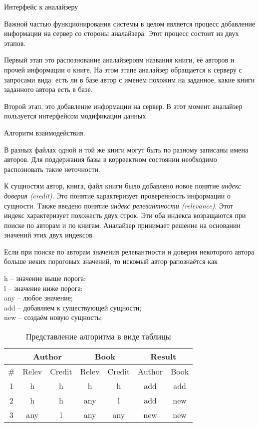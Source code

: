 \newpage

Интерфейс к аналайзеру


Важной частью функционирования системы в целом является процесс добавление информации на сервер со стороны аналайзера. Этот процесс состоит из двух этапов. 

Первый этап это распознование аналайзеровм названия книги, её авторов и прочей информации о книге. На этом этапе аналайзер обращается к серверу с запросами вида: есть ли в базе автор с именем похожим на заданное, какие книги заданного автора есть в базе.

Второй этап, это добавление информации на сервер. В этот момент аналайзер пользуется интерфейсом модификации данных.


Алгоритм взаимодействия.

В разных файлах одной и той же книги могут быть по разному записаны имена авторов. Для поддержания базы в корреектном состоянии необходимо распозновать такие неточности.

К сущностям автор, книга, файл книги было добавлено новое понятие {\em индекс доверия (credit)}. Это понятие характеризует проверенность информации о сущности.
Также введено понятие {\em индекс релевантности (relevance)}. Этот индекс характеризует похожесть двух строк.
Эти оба индекса возращаются при поиске по авторам и по книгам.
Аналайзер принимает решение на основании значений этих двух индексов.

Если при поиске по авторам значения релевантности и доверия некоторого автора
больше неких пороговых значений,
то искомый автор рапознаётся как 



h -- значение выше порога;\\
l -- значение ниже порога;\\
any -- любое значение;\\
add -- добавляем к существующей сущности; \\
new -- создаём новую сущность;\\

\begin{table}
  \caption{Представление алгоритма в виде таблицы}
  \begin{tabular}{ | c | c | c | c | c || c | c |}
  \hline
   & \multicolumn{2}{c|}{Author} & \multicolumn{2}{c||}{Book} & \multicolumn{2}{c|}{Result} \\
    \hline
      \# & Relev & Credit & Relev & Credit & Author & Book \\ \hline
      1 & h   & h   & h   & h   & add & add \\ \hline
      2 & h   & h   & any & l   & add & new \\ \hline
      3 & any & l   & any & any & new & new \\
    \hline
  \end{tabular}
\end{table}



